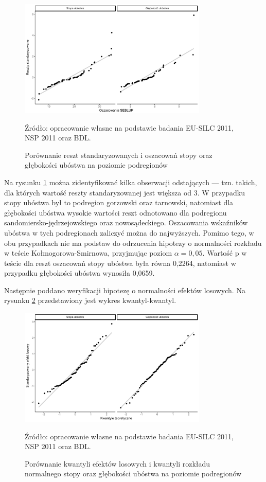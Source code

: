 \begin{figure}[htp]
\centering
\includegraphics[width=0.8\textwidth]{04_wykresy/fh_podreg_r_model-1.pdf}
\caption{Porównanie reszt standaryzowanych i oszacowań stopy oraz głębokości ubóstwa na poziomie podregionów}
\small{Źródło: opracowanie własne na podstawie badania EU-SILC 2011, NSP 2011 oraz BDL.}
\label{fig:podreg_model_r}
\end{figure}

Na rysunku \ref{fig:podreg_model_r} można zidentyfikować kilka obserwacji odstających --- tzn. takich, dla których wartość reszty standaryzowanej jest większa od 3. W przypadku stopy ubóstwa był to podregion gorzowski oraz tarnowski, natomiast dla głębokości ubóstwa wysokie wartości reszt odnotowano dla podregionu sandomiersko-jędrzejowskiego oraz nowosądeckiego. Oszacowania wskaźników ubóstwa w tych podregionach zaliczyć można do najwyższych. Pomimo tego, w obu przypadkach nie ma podstaw do odrzucenia hipotezy o normalności rozkładu w teście Kołmogorowa-Smirnowa, przyjmując poziom $\alpha=0,05$. Wartość p w teście dla reszt oszacowań stopy ubóstwa była równa 0,2264, natomiast w przypadku głębokości ubóstwa wynosiła 0,0659.

Następnie poddano weryfikacji hipotezę o normalności efektów losowych. Na rysunku \ref{fig:podreg_model_u} przedstawiony jest wykres kwantyl-kwantyl.

\begin{figure}[htp]
\centering
\includegraphics[width=0.8\textwidth]{04_wykresy/fh_podreg_u_model-1.pdf}
\caption{Porównanie kwantyli efektów losowych i kwantyli rozkładu
normalnego stopy oraz głębokości ubóstwa na poziomie podregionów}
\small{Źródło: opracowanie własne na podstawie badania EU-SILC 2011, NSP 2011 oraz BDL.}
\label{fig:podreg_model_u}
\end{figure}

